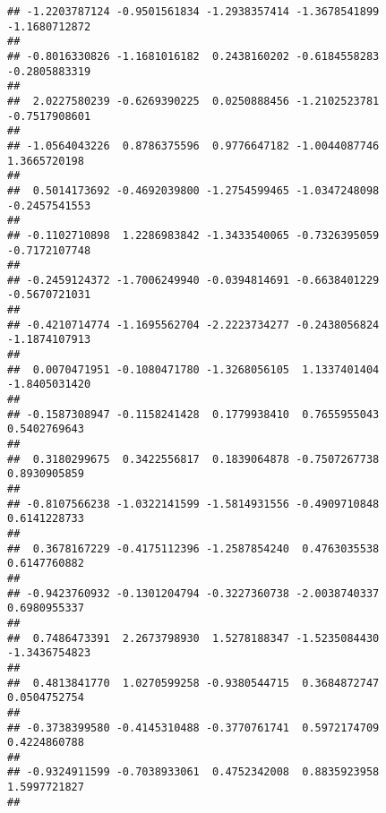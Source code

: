 \documentclass[]{article}
\begin{document}
\begin{verbatim}
## -1.2203787124 -0.9501561834 -1.2938357414 -1.3678541899 -1.1680712872 
##                                                                       
## -0.8016330826 -1.1681016182  0.2438160202 -0.6184558283 -0.2805883319 
##                                                                       
##  2.0227580239 -0.6269390225  0.0250888456 -1.2102523781 -0.7517908601 
##                                                                       
## -1.0564043226  0.8786375596  0.9776647182 -1.0044087746  1.3665720198 
##                                                                       
##  0.5014173692 -0.4692039800 -1.2754599465 -1.0347248098 -0.2457541553 
##                                                                       
## -0.1102710898  1.2286983842 -1.3433540065 -0.7326395059 -0.7172107748 
##                                                                       
## -0.2459124372 -1.7006249940 -0.0394814691 -0.6638401229 -0.5670721031 
##                                                                       
## -0.4210714774 -1.1695562704 -2.2223734277 -0.2438056824 -1.1874107913 
##                                                                       
##  0.0070471951 -0.1080471780 -1.3268056105  1.1337401404 -1.8405031420 
##                                                                       
## -0.1587308947 -0.1158241428  0.1779938410  0.7655955043  0.5402769643 
##                                                                       
##  0.3180299675  0.3422556817  0.1839064878 -0.7507267738  0.8930905859 
##                                                                       
## -0.8107566238 -1.0322141599 -1.5814931556 -0.4909710848  0.6141228733 
##                                                                       
##  0.3678167229 -0.4175112396 -1.2587854240  0.4763035538  0.6147760882 
##                                                                       
## -0.9423760932 -0.1301204794 -0.3227360738 -2.0038740337  0.6980955337 
##                                                                       
##  0.7486473391  2.2673798930  1.5278188347 -1.5235084430 -1.3436754823 
##                                                                       
##  0.4813841770  1.0270599258 -0.9380544715  0.3684872747  0.0504752754 
##                                                                       
## -0.3738399580 -0.4145310488 -0.3770761741  0.5972174709  0.4224860788 
##                                                                       
## -0.9324911599 -0.7038933061  0.4752342008  0.8835923958  1.5997721827 
##                                                                       

\end{verbatim}
\end{document}
